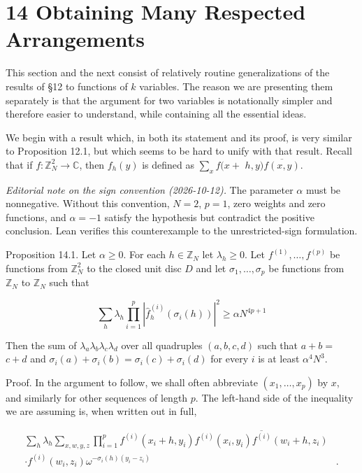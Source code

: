 \documentclass[10pt]{article}
\begin{document}
\section*{14 Obtaining Many Respected Arrangements}
This section and the next consist of relatively routine generalizations of the results of §12 to functions of $k$ variables. The reason we are presenting them separately is that the argument for two variables is notationally simpler and therefore easier to understand, while containing all the essential ideas.

We begin with a result which, in both its statement and its proof, is very similar to Proposition 12.1, but which seems to be hard to unify with that result. Recall that if $f: \mathbb{Z}_{N}^{2} \rightarrow \mathbb{C}$, then $f_{h}(y)$ is defined as $\sum_{x} f(x+$ $h, y) \overline{f(x, y)}$.

\emph{Editorial note on the sign convention (2026-10-12).}
The parameter $\alpha$ must be nonnegative. Without this convention,
$N=2$, $p=1$, zero weights and zero functions, and $\alpha=-1$ satisfy
the hypothesis but contradict the positive conclusion. Lean verifies this
counterexample to the unrestricted-sign formulation.

Proposition 14.1. Let $\alpha\geqslant0$. For each $h \in \mathbb{Z}_{N}$ let $\lambda_{h} \geqslant 0$. Let $f^{(1)}, \ldots, f^{(p)}$ be functions from $\mathbb{Z}_{N}^{2}$ to the closed unit disc $D$ and let $\sigma_{1}, \ldots, \sigma_{p}$ be functions from $\mathbb{Z}_{N}$ to $\mathbb{Z}_{N}$ such that

$$
\sum_{h} \lambda_{h} \prod_{i=1}^{p}\left|\hat{f}_{h}^{(i)}\left(\sigma_{i}(h)\right)\right|^{2} \geqslant \alpha N^{4 p+1}
$$

Then the sum of $\lambda_{a} \lambda_{b} \lambda_{c} \lambda_{d}$ over all quadruples $(a, b, c, d)$ such that $a+b=$ $c+d$ and $\sigma_{i}(a)+\sigma_{i}(b)=\sigma_{i}(c)+\sigma_{i}(d)$ for every $i$ is at least $\alpha^{4} N^{3}$.

Proof. In the argument to follow, we shall often abbreviate $\left(x_{1}, \ldots, x_{p}\right)$ by $x$, and similarly for other sequences of length $p$. The left-hand side of the inequality we are assuming is, when written out in full,

$$
\begin{aligned}
\sum_{h} \lambda_{h} \sum_{x, w, y, z} \prod_{i=1}^{p} f^{(i)}\left(x_{i}+h, y_{i}\right) \overline{f^{(i)}\left(x_{i}, y_{i}\right) f^{(i)}\left(w_{i}+h, z_{i}\right)} & \\
\cdot f^{(i)}\left(w_{i}, z_{i}\right) \omega^{-\sigma_{i}(h)\left(y_{i}-z_{i}\right)} & .
\end{aligned}
$$
\end{document}
